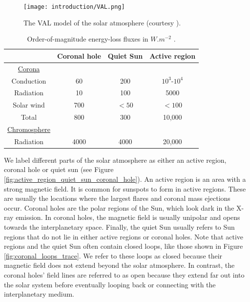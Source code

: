 \begin{figure}[!htp]
    \centering
    \texttt{[image: introduction/VAL.png]}
    \caption{The VAL model \citep{Vernazza1981} of the solar atmosphere (courtesy \citet{Williams2018}).}
    \label{fig:VAL_atmosphere}
\end{figure}

\begin{table}[!htp]
    \label{tbl:energy_losses_corona_chromosphere}
    \centering
    \begin{tabular}{c c c c}
        \hline
         & Coronal hole & Quiet Sun & Active region \\
        \hline
        \underline{Corona}  \\
        Conduction & 60 & 200 & $10^3\text{-}10^4$ \\
        Radiation & 10 & 100 & 5000 \\
        Solar wind & 700 & $<50$ & $<100$ \\
        \hline
        Total & 800 & 300 & 10,000 \\
        \hline
        \underline{Chromosphere} \\
        Radiation & 4000 & 4000 & 20,000
        
    \end{tabular}
    \caption{Order-of-magnitude energy-loss fluxes in $\si{W.m^{-2}}$ \citep{Withbroe1977, Priest2014}.}
    \label{tab:energy_loss_fluxes}
\end{table}

We label different parts of the solar atmosphere as either an active region, coronal hole or quiet sun (see Figure \ref{fig:active_region_quiet_sun_coronal_hole}). An active region is an area with a strong magnetic field. It is common for sunspots to form in active regions. These are usually the locations where the largest flares and coronal mass ejections occur. Coronal holes are the polar regions of the Sun, which look dark in the X-ray emission. In coronal holes, the magnetic field is usually unipolar and opens towards the interplanetary space. Finally, the quiet Sun usually refers to Sun regions that do not lie in either active regions or coronal holes. Note that active regions and the quiet Sun often contain closed loops, like those shown in Figure \ref{fig:coronal_loops_trace}. We refer to these loops as closed because their magnetic field does not extend beyond the solar atmosphere. In contrast, the coronal holes' field lines are referred to as open because they extend far out into the solar system before eventually looping back or connecting with the interplanetary medium.

